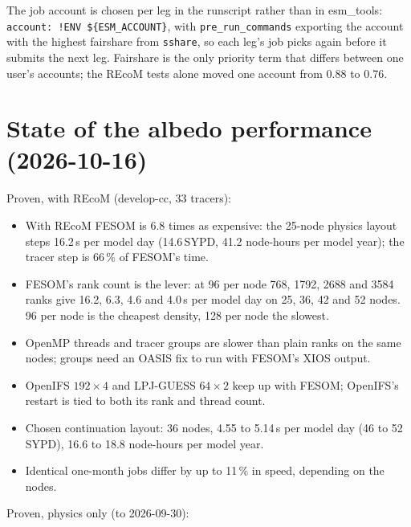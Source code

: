 \documentclass[11pt,a4paper]{article}
\begin{document}
The job account is chosen per leg in the runscript rather than in esm\_tools: \texttt{account: !ENV \$\{ESM\_ACCOUNT\}}, with \texttt{pre\_run\_commands} exporting the account with the highest fairshare from \texttt{sshare}, so each leg's job picks again before it submits the next leg. Fairshare is the only priority term that differs between one user's accounts; the REcoM tests alone moved one account from 0.88 to 0.76.

\section{State of the albedo performance (2026-10-16)}\label{sec:state}
Proven, with REcoM (develop-cc, 33 tracers):
\begin{itemize}
\item With REcoM FESOM is 6.8 times as expensive: the 25-node physics layout steps 16.2\,s per model day (14.6\,SYPD, 41.2 node-hours per model year); the tracer step is 66\,\% of FESOM's time.
\item FESOM's rank count is the lever: at 96 per node 768, 1792, 2688 and 3584 ranks give 16.2, 6.3, 4.6 and 4.0\,s per model day on 25, 36, 42 and 52 nodes. 96 per node is the cheapest density, 128 per node the slowest.
\item OpenMP threads and tracer groups are slower than plain ranks on the same nodes; groups need an OASIS fix to run with FESOM's XIOS output.
\item OpenIFS $192\times4$ and LPJ-GUESS $64\times2$ keep up with FESOM; OpenIFS's restart is tied to both its rank and thread count.
\item Chosen continuation layout: 36 nodes, 4.55 to 5.14\,s per model day (46 to 52\,SYPD), 16.6 to 18.8 node-hours per model year.
\item Identical one-month jobs differ by up to 11\,\% in speed, depending on the nodes.
\end{itemize}
Proven, physics only (to 2026-09-30):
\end{document}
